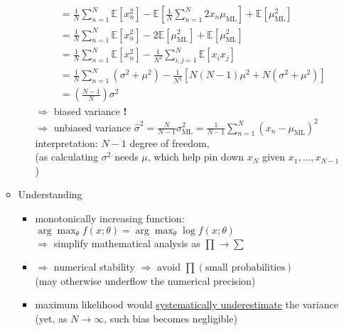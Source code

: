 \begin{itemize}
\begin{itemize}
\begin{itemize}
\begin{align*}
		&= \frac 1N \sum_{n=1}^N \mathbb E[x_n^2] - \mathbb E[\frac 1N \sum_{n=1}^N 2x_n \mu_\text{ML}] + \mathbb E[\mu_\text{ML}^2] \\ 
		&= \frac 1N \sum_{n=1}^N \mathbb E[x_n^2] - 2\mathbb E[\mu_\text{ML}^2] + \mathbb E[\mu_\text{ML}^2] \\
		&= \frac 1N \sum_{n=1}^N \mathbb E[x_n^2] - \frac 1{N^2} \sum_{i,j=1}^N \mathbb E[x_ix_j] \\
		&= \frac 1N \sum_{n=1}^N (\sigma^2 + \mu^2) - \frac 1{N^2} [N(N-1)\mu^2 + N(\sigma^2+\mu^2)] \tag{by 2nd moment of Gaussian \(\mathbb E[x^2]\) and i.i.d assumption} \\
		&= \left(\frac {N-1}N  \right) \sigma^2 \end{align*}
		$\Rightarrow$ biased variance \textbf{!} \\
		$\Rightarrow $ unbiased variance $\displaystyle \hat \sigma^2 = \frac N {N-1}\sigma^2_\text{ML} = \frac 1{N-1} \sum_{n=1}^N (x_n-\mu_\text{ML})^2 $ \\
		interpretation: $N-1$  degree of freedom, \\
		(as calculating $\sigma^2$ needs $\mu$, which help pin down $x_N$ given $x_1,...,x_{N-1}$)
		\end{itemize}
	\item Understanding
		\begin{itemize}
		\item monotonically increasing function: $\arg\max_{\theta}f(x;\theta) = \arg\max_\theta\log f(x;\theta)$ \\
		$\Rightarrow$ simplify mathematical analysis as $\prod \rightarrow \sum$
		\item $\Rightarrow$ numerical stability $\Rightarrow \text{ avoid } \prod (\text{small probabilities})$ \\		
		(may otherwise underflow the numerical precision)
		\item maximum likelihood would \underline{systematically underestimate} the variance \\
		(yet, as $N\rightarrow \infty$, such bias becomes negligible)
		\end{itemize}
	\end{itemize}
\end{itemize}